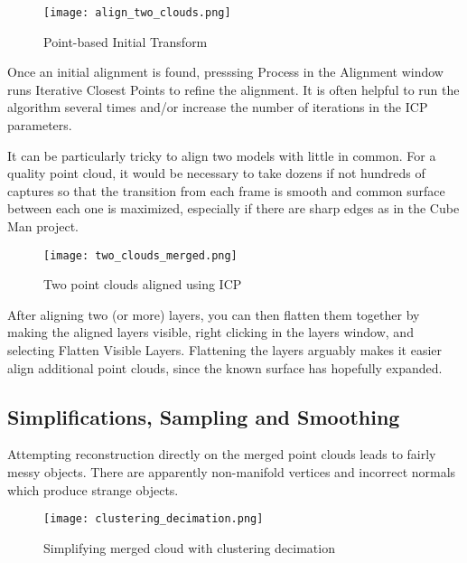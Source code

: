 \begin{figure}[h]
\centering
\texttt{[image: align\_two\_clouds.png]}
\caption{Point-based Initial Transform}
\end{figure}

Once an initial alignment is found, presssing Process in the Alignment window
runs Iterative Closest Points to refine the alignment. It is often helpful
to run the algorithm several times and/or increase the number of iterations in the
ICP parameters.

It can be particularly tricky to align two models with little in common. For a
quality point cloud, it would be necessary to take dozens if not hundreds
of captures so that the transition from each frame is smooth and common surface
between each one is maximized, especially if there are sharp edges as in the
Cube Man project.

\begin{figure}[h]
\centering
\texttt{[image: two\_clouds\_merged.png]}
\caption{Two point clouds aligned using ICP}
\end{figure}

After aligning two (or more) layers, you can then flatten them together by making
the aligned layers visible, right clicking in the layers window, and selecting
Flatten Visible Layers. Flattening the layers arguably makes it easier align additional
point clouds, since the known surface has hopefully expanded.

\subsection{Simplifications, Sampling and Smoothing}
Attempting reconstruction directly on the merged point clouds leads to fairly messy
objects. There are apparently non-manifold vertices and incorrect normals which produce strange
objects.

\begin{figure}[h]
\centering
\texttt{[image: clustering\_decimation.png]}
\caption{Simplifying merged cloud with clustering decimation}
\end{figure}
